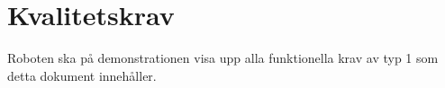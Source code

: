 \section{Kvalitetskrav}
Roboten ska på demonstrationen visa upp alla funktionella krav av typ 1 som detta dokument innehåller.
